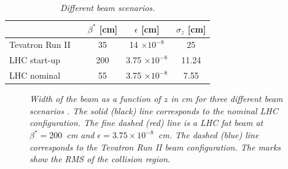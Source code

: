\documentclass{cmspaper}
\begin{document}
  
\begin{table} [th]
\begin{center}
 \caption{\it   \label{table:beams} Different beam scenarios.}
\begin{tabular}{|l|c|c|c|} \hline
 & $\beta^*$ [cm] & $\epsilon$ [cm] & $\sigma_z$ [cm]\\\hline
Tevatron Run II~\cite{RunIIBeam}~\cite{handbook}     & 35   & 14 $\times 10^{-8}$   & 25\\ 
LHC start-up~\cite{PhysTDCVol1}~\cite{LHCBeam}  & 200  &3.75 $\times 10^{-8}$  & 11.24\\
LHC nominal~\cite{PhysTDCVol1}~\cite{LHCBeam}   & 55   &3.75 $\times 10^{-8}$  & 7.55\\\hline
 \end{tabular}
\end{center}
\end{table}


\begin{figure}[hbtp]
  \begin{center}
    \caption{\it Width of the beam as a function of $z$ in cm for three different beam scenarios . The
      solid (black) line corresponds to the nominal LHC configuration. The fine
      dashed (red) line is a LHC fat beam at $\beta^*=200$~cm and 
      $\epsilon=3.75\times 10^{-8}$~cm. The dashed (blue) line corresponds to the 
      Tevatron Run II beam configuration. The marks show the RMS of the collision region.}
    \label{fig:beta_functions}
  \end{center}
\end{figure}
\end{document}
